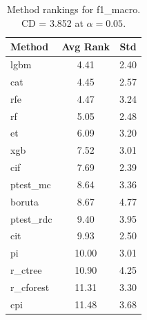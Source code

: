 \begin{table}[h]
\centering
\caption{Method rankings for f1_macro. CD = 3.852 at $\alpha=0.05$.}
\label{tab:ranks_f1_macro}
\begin{tabular}{lcc}
\toprule
Method & Avg Rank & Std \\
\midrule
lgbm & 4.41 & 2.40 \\
cat & 4.45 & 2.57 \\
rfe & 4.47 & 3.24 \\
rf & 5.05 & 2.48 \\
et & 6.09 & 3.20 \\
xgb & 7.52 & 3.01 \\
cif & 7.69 & 2.39 \\
ptest_mc & 8.64 & 3.36 \\
boruta & 8.67 & 4.77 \\
ptest_rdc & 9.40 & 3.95 \\
cit & 9.93 & 2.50 \\
pi & 10.00 & 3.01 \\
r_ctree & 10.90 & 4.25 \\
r_cforest & 11.31 & 3.30 \\
cpi & 11.48 & 3.68 \\
\bottomrule
\end{tabular}
\end{table}